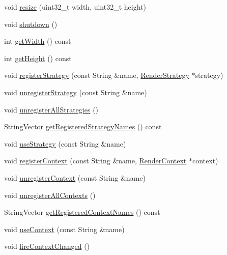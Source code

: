 \begin{DoxyCompactItemize}
\item 
void \hyperlink{class_verdi_1_1_render_system_a59a2d356c64437467ad34fab5e606a57}{resize} (uint32\-\_\-t width, uint32\-\_\-t height)
\item 
void \hyperlink{class_verdi_1_1_render_system_acc054feb7d679cee2a52e52c1ac319a0}{shutdown} ()
\item 
int \hyperlink{class_verdi_1_1_render_system_acfc5c47cb5cbe81778276477eb25b924}{get\-Width} () const 
\item 
int \hyperlink{class_verdi_1_1_render_system_a856a75c8395ced7cc00cadb3949b721d}{get\-Height} () const 
\item 
void \hyperlink{class_verdi_1_1_render_system_a3546da465b997baa890ff000a212bcee}{register\-Strategy} (const \-String \&name, \hyperlink{class_verdi_1_1_render_strategy}{\-Render\-Strategy} $\ast$strategy)
\item 
void \hyperlink{class_verdi_1_1_render_system_aba2d0949a50e4a1868f03b8e00cfc8bb}{unregister\-Strategy} (const \-String \&name)
\item 
void \hyperlink{class_verdi_1_1_render_system_ad2ebe6e3f08550ca31e3c31280302fe8}{unregister\-All\-Strategies} ()
\item 
\-String\-Vector \hyperlink{class_verdi_1_1_render_system_ad1d75942e1038288efb9852837466ca9}{get\-Registered\-Strategy\-Names} () const 
\item 
void \hyperlink{class_verdi_1_1_render_system_ab48f8df6c4eecf80a02f9b6ce1c0f944}{use\-Strategy} (const \-String \&name)
\item 
void \hyperlink{class_verdi_1_1_render_system_a3108a4a7efd0ccd9992799a534eb9496}{register\-Context} (const \-String \&name, \hyperlink{class_verdi_1_1_render_context}{\-Render\-Context} $\ast$context)
\item 
void \hyperlink{class_verdi_1_1_render_system_a790e5c5a740bb0c41003c416290f2bbd}{unregister\-Context} (const \-String \&name)
\item 
void \hyperlink{class_verdi_1_1_render_system_af222d1037b9ba315d54fb9c9d4a5ae30}{unregister\-All\-Contexts} ()
\item 
\-String\-Vector \hyperlink{class_verdi_1_1_render_system_a7f54ce4fb36bc9bd97eeb546675e2e3d}{get\-Registered\-Context\-Names} () const 
\item 
void \hyperlink{class_verdi_1_1_render_system_aa56a1cb1e965f2aaa741939843b1a753}{use\-Context} (const \-String \&name)
\item 
void \hyperlink{class_verdi_1_1_render_system_a177c4d01c674d52649e5b82476b6415f}{fire\-Context\-Changed} ()
\end{DoxyCompactItemize}
